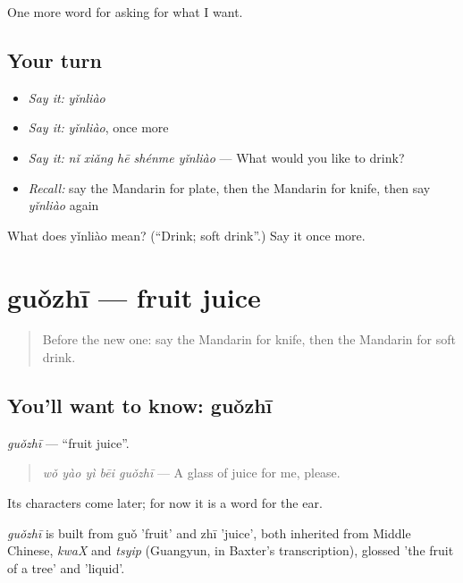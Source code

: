 \begin{grammarlens}[title={What you've built}]
One more word for asking for what I want.
\end{grammarlens}

\subsection*{Your turn}
\begin{itemize}
\raggedright
  \item \emph{Say it:} \emph{yǐnliào}
  \item \emph{Say it:} \emph{yǐnliào}, once more
  \item \emph{Say it:} \emph{nǐ xiǎng hē shénme yǐnliào} — What would you like to drink?
  \item \emph{Recall:} say the Mandarin for plate, then the Mandarin for knife, then say \emph{yǐnliào} again
\end{itemize}

\begin{tcolorbox}[breakable,colback=teal!4,colframe=teal!35!black,title={Before you move on}]
What does yǐnliào mean? (\textquotedblleft{}Drink; soft drink\textquotedblright{}.) Say it once more.
\end{tcolorbox}
\section[guǒzhī]{guǒzhī — fruit juice}

\label{lesson:ZH-C102-guozhi}



\begin{quote}
Before the new one: say the Mandarin for knife, then the Mandarin for soft drink.
\end{quote}

\subsection*{You'll want to know: guǒzhī}
\emph{guǒzhī} — \textquotedblleft{}fruit juice\textquotedblright{}.

\begin{quote}
\emph{wǒ yào yì bēi guǒzhī} — A glass of juice for me, please.
\end{quote}

Its characters come later; for now it is a word for the ear.

\begin{cousinweb}
\emph{guǒzhī} is built from guǒ 'fruit' and zhī 'juice', both inherited from Middle Chinese, \emph{kwaX} and \emph{tsyip} (Guangyun, in Baxter's transcription), glossed 'the fruit of a tree' and 'liquid'.
\end{cousinweb}

